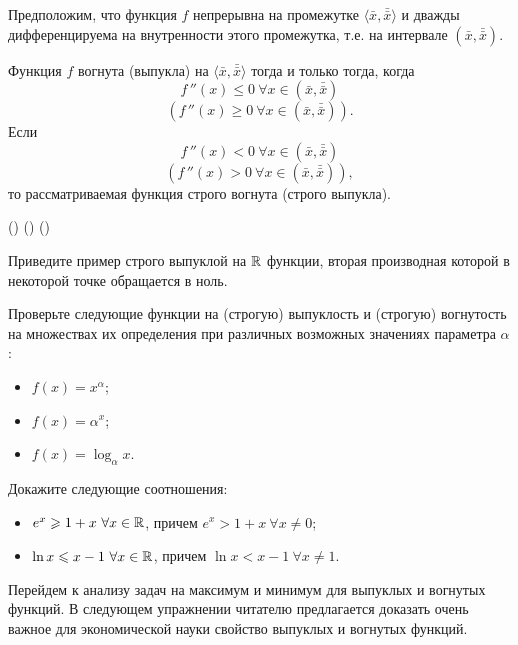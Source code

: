 \begin{prop}
    Предположим, что функция $f$ непрерывна на промежутке
    $\langle \bar{x},\bar{\bar{x}} \rangle$
     и дважды дифференцируема на внутренности этого промежутка, т.е. на
     интервале $(\bar{x},\bar{\bar{x}})$.

    Функция $f$ вогнута (выпукла) на
    $\langle \bar{x},\bar{\bar{x}} \rangle$ тогда и только тогда, когда
    \[f\,''(x)\leqslant0 \ \forall x\in(\bar{x},\bar{\bar{x}})\]
    \[(f\,''(x)\geqslant0 \ \forall x\in(\bar{x},\bar{\bar{x}})).\]
    Если
    \[f\,''(x)<0 \ \forall x\in(\bar{x},\bar{\bar{x}})\]
    \[(f\,''(x)>0 \ \forall x\in(\bar{x},\bar{\bar{x}})),\]
    то рассматриваемая функция строго вогнута (строго выпукла).
\end{prop}
    () () ()

\begin{exer}
    Приведите пример строго выпуклой на $\mathbb{R}$ функции, вторая производная
    которой в некоторой точке обращается в ноль.
\end{exer}

\begin{exer}
    Проверьте следующие функции на (строгую) выпуклость и (строгую)
    вогнутость на множествах их определения при различных возможных
    значениях параметра $\alpha$:
    \begin{itemize}
      \item $f(x)=x^{\alpha}$;
      \item $f(x)=\alpha^{x}$;
      \item $f(x)=\log_{\alpha}x$.
    \end{itemize}
\end{exer}

\begin{exer}
    Докажите следующие соотношения:
    \begin{itemize}
      \item $e^{x}\geqslant1+x \ \forall x\in\mathbb{R}$, причем $e^{x}>1+x \  \forall   x\neq0$;
      \item $\ln x \leqslant x-1  \ \forall x\in\mathbb{R}$, причем $\ln x < x-1 \ \forall  x\neq1$.
    \end{itemize}

\end{exer}




    Перейдем к анализу задач на максимум и минимум для выпуклых и
    вогнутых функций.
    В следующем упражнении читателю предлагается доказать очень
    важное для экономической науки свойство выпуклых и вогнутых функций.


